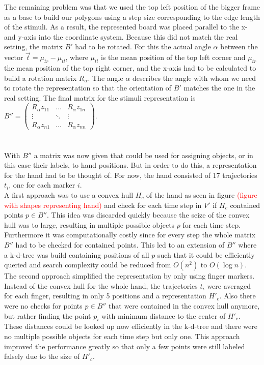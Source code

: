 The remaining problem was that we used the top left position of the bigger frame as a base to build our polygons using a step size corresponding to the edge length of the stimuli. As a result, the represented board was placed parallel to the x- and y-axis into the coordinate system. Because this did not match the real setting, the matrix $ B' $ had to be rotated. For this the actual angle $ \alpha $ between the vector $\vec{t} = \mu_{tr} - \mu_{tl}$, where $\mu_{tl}$ is the mean position of the top left corner and $\mu_{tr}$ the mean position of the top right corner,  and the x-axis had to be calculated to build a rotation matrix $ R_{\alpha} $. The angle $\alpha$ describes the angle with whom we need to rotate the representation so that the orientation of $ B' $ matches the one in the real setting. The final matrix for the stimuli representation is $ B''  = \begin{pmatrix}
 R_{\alpha}z_{11} & \hdots &  R_{\alpha}z_{1n} \\
\vdots & \ddots & \vdots \\
 R_{\alpha}z_{n1} & \hdots &  R_{\alpha}z_{nn}
\end{pmatrix}$.\\
\\
\\
With $ B'' $ a matrix was now given that could be used for assigning objects, or in this case their labels, to hand positions. But in order to do this, a representation for the hand had to be thought of. For now, the hand consisted of 17 trajectories $ t_{i} $, one for each marker $ i $. \\
A first approach was to use a convex hull $ H_{c} $ of the hand as seen in figure \textcolor{red}{(figure with shapes representing hand)} and check for each time step in $ V' $ if $ H_{c} $ contained points $ p \in B'' $. This idea was discarded quickly because the seize of the convex hull was to large, resulting in multiple possible objects $ p $ for each time step. Furthermore it was computationally costly since for every step the whole matrix $ B'' $ had to be checked for contained points. This led to an extension of $ B'' $ where a k-d-tree was build containing positions of all $p$ such that it could be efficiently queried and search complexity could be reduced from $ O(n^{2}) $ to $ O(\log n) $. \\
The second approach simplified the representation by only using finger markers. Instead of the convex hull for the whole hand, the trajectories $ t_{i} $ were averaged for each finger, resulting in only 5 positions and a representation $ H'_{c} $. Also there were no checks for points $ p \in B'' $ that were contained in the convex hull anymore, but rather finding the point $ p_{i} $ with minimum distance to the center of $ H'_{c} $. These distances could be looked up now efficiently in the k-d-tree and there were no multiple possible objects for each time step but only one. This approach improved the performance greatly so that only a few points were still labeled falsely due to the size of $ H'_{c} $.\\

